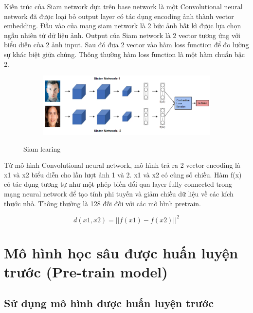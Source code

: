 Kiến trúc của Siam network dựa trên base network là một Convolutional neural network
đã được loại bỏ output layer có tác dụng encoding ảnh thành vector embedding.
Đầu vào của mạng siam network là 2 bức ảnh bất kì được lựa chọn ngẫu nhiên từ dữ liệu ảnh.
Output của Siam network là 2 vector tương ứng với biểu diễn của 2 ảnh input.
Sau đó đưa 2 vector vào hàm loss function để đo lường sự khác biệt giữa chúng.
Thông thường hàm loss function là một hàm chuẩn bậc 2.

\begin{figure}
    \begin{subfigure}{1.\textwidth}
        \begin{center}
            \includegraphics[width=1.\linewidth]{Chapters/items/chap2_16.jpg}
        \end{center}
        \label{fig:chap2_16}
    \end{subfigure}
    \caption{Siam learing}
\end{figure}

\newpage
Từ mô hình Convolutional neural network, mô hình trả ra 2 vector encoding là x1 và x2
biểu diễn cho lần lượt ảnh 1 và 2. x1 và x2 có cùng số chiều.
Hàm f(x) có tác dụng tương tự như một phép biến đổi qua layer fully connected
trong mạng neural network để tạo tính phi tuyến và giảm chiều dữ liệu về các kích thước nhỏ.
Thông thường là 128 đối đối với các mô hình pretrain.


\begin{equation}
    d(x1, x2) = ||f(x1)-f(x2)||^2
\end{equation}

\newpage
\section{Mô hình học sâu được huấn luyện trước (Pre-train model)}
\subsection{Sử dụng mô hình được huấn luyện trước}

